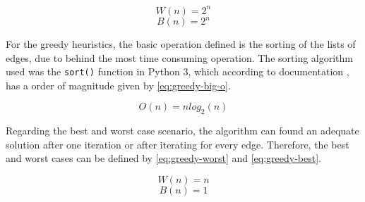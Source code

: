 \begin{equation}
    W(n) = 2^n
    \label{eq:ex-worst}
\end{equation}
\begin{equation}
    B(n) = 2^n
    \label{eq:ex-best}
\end{equation}

For the greedy heuristics, the basic operation defined is the sorting of the lists of edges, due to behind the most time consuming operation.
The sorting algorithm used was the \verb|sort()| function in Python 3, which according to documentation \cite{sortpython}, has a order of magnitude given by \autoref{eq:greedy-big-o}.

\begin{equation}
    O(n) = nlog_2(n)
    \label{eq:greedy-big-o}
\end{equation}

Regarding the best and worst case scenario, the algorithm can found an adequate solution after one iteration or after iterating for every edge.
Therefore, the best and worst cases can be defined by \autoref{eq:greedy-worst} and \autoref{eq:greedy-best}.

\begin{equation}
    W(n) = n
    \label{eq:greedy-worst}
\end{equation}
\begin{equation}
    B(n) = 1
    \label{eq:greedy-best}
\end{equation}